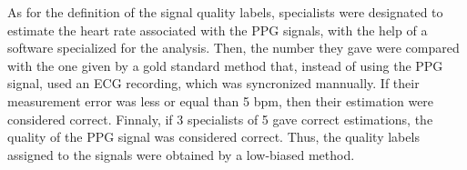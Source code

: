 As for the definition of the signal quality labels, specialists were designated to estimate the heart rate associated with the \acrshort{PPG} signals, with the help of a software specialized for the analysis. Then, the number they gave were compared with the one given by a gold standard method that, instead of using the \acrshort{PPG} signal, used an ECG recording, which was syncronized mannually. If their measurement error was less or equal than 5 bpm, then their estimation were considered correct. Finnaly, if 3 specialists of 5 gave correct estimations, the quality of the \acrshort{PPG} signal was considered correct. Thus, the quality labels assigned to the signals were obtained by a low-biased method. 






%









